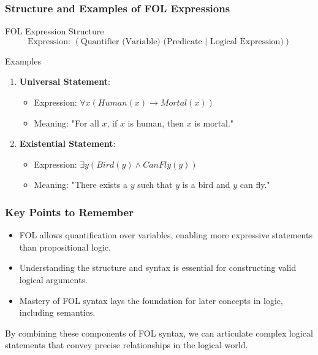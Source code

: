 \documentclass[aspectratio=169]{beamer}
\begin{document}
\begin{frame}[fragile]
    \frametitle{Structure and Examples of FOL Expressions}
    \begin{block}{FOL Expression Structure}
        \begin{equation}
            \text{Expression: } (\text{Quantifier (Variable) (Predicate | Logical Expression)})
        \end{equation}
    \end{block}
    \begin{block}{Examples}
        \begin{enumerate}
            \item \textbf{Universal Statement}: 
                \begin{itemize}
                    \item Expression: $\forall x (Human(x) \rightarrow Mortal(x))$
                    \item Meaning: "For all $x$, if $x$ is human, then $x$ is mortal."
                \end{itemize}
            \item \textbf{Existential Statement}: 
                \begin{itemize}
                    \item Expression: $\exists y (Bird(y) \land CanFly(y))$
                    \item Meaning: "There exists a $y$ such that $y$ is a bird and $y$ can fly."
                \end{itemize}
        \end{enumerate}
    \end{block}
\end{frame}

\begin{frame}[fragile]
    \frametitle{Key Points to Remember}
    \begin{itemize}
        \item FOL allows quantification over variables, enabling more expressive statements than propositional logic.
        \item Understanding the structure and syntax is essential for constructing valid logical arguments.
        \item Mastery of FOL syntax lays the foundation for later concepts in logic, including semantics.
    \end{itemize}
    By combining these components of FOL syntax, we can articulate complex logical statements that convey precise relationships in the logical world.
\end{frame}
\end{document}
